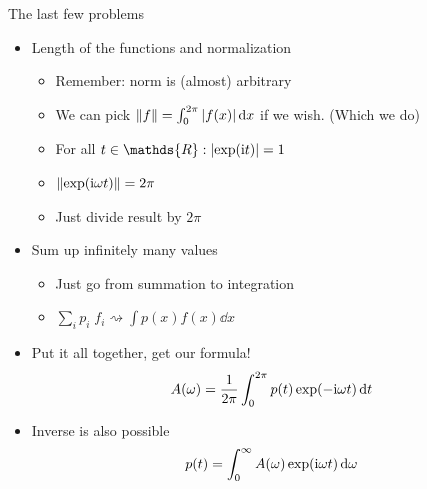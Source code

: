 
\begin{frame}[fragile]{The last few problems}
%
\begin{itemize}
\item Length of the functions and normalization
	\begin{itemize}
	\item Remember: norm is (almost) arbitrary
	\item We can pick $\norm{f} = \int_0^{2\pi} \abs{f(x)} \dd{x}$ if we wish. (Which we do)
	\item For all $t \in \mathds{R} : \abs{ \exp(\iunit t) } = 1$
	\item[\Thus] $\norm{\exp(\mathrm{i} \omega t)} = 2\pi$
	\item[\Thus] Just divide result by $2\pi$
	\end{itemize}
\item Sum up infinitely many values
	\begin{itemize}
	\item Just go from summation to integration
	\item $\sum_i p_i \; f_i \rightsquigarrow \int p(x) f(x) \dd{x}$
	\end{itemize}
\item Put it all together, get our formula!
	\[ A(\omega) = \frac{1}{2\pi} \int_{0}^{2\pi} p(t) \exp(-\mathrm{i} \omega t) \dd{t} \]
\item Inverse is also possible
	\[ p(t) = \int_{0}^{\infty} A(\omega) \exp(\mathrm{i} \omega t) \dd{\omega} \]
\end{itemize}
%
\end{frame}



